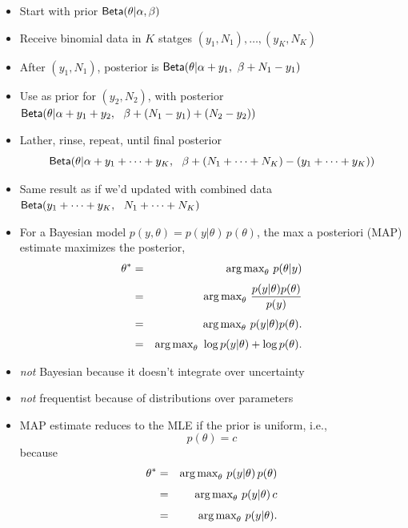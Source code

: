 \documentclass[10pt]{report}
\begin{document}
\vspace*{-4pt}
\begin{itemize}
\item Start with prior $\text{\sf Beta}(\theta|\alpha,\beta)$
\item Receive binomial data in $K$ statges $(y_1, N_1), \ldots, (y_K, N_K)$
\item After $(y_1,N_1)$, posterior is 
  $\text{\sf Beta}(\theta|\alpha + y_1, \ \beta + N_1 - y_1)$
\item Use as prior for $(y_2,N_2)$, with posterior \\[3pt]
  $\distro{Beta}(\theta|\alpha + y_1 + y_2, \ \ \beta + (N_1 -
  y_1) + (N_2 - y_2))$
\item Lather, rinse, repeat, until final posterior
\[
\text{\sf Beta}(\theta|\alpha + y_1 + \cdots + y_K, \ \ \beta + (N_1 +
\cdots + N_K) - (y_1 + \cdots + y_K))
\]
\item Same result as if we'd updated with combined data \\[3pt]
$\text{\sf Beta}(y_1 + \cdots + y_K, \ \ N_1 + \cdots + N_K)$
\end{itemize}



\vspace*{-4pt}
\begin{itemize}
\item For a Bayesian model $p(y,\theta) = p(y|\theta) \, p(\theta)$,
the max a posteriori (MAP) estimate maximizes the posterior,
\begin{eqnarray*}
\theta^{*} 
& = & \mbox{arg\,max}_{\theta} \ p(\theta|y)
\\[3pt]
& = & \mbox{arg\,max}_{\theta} \ \frac{\displaystyle p(y|\theta) p(\theta)}{p(y)}
\\[3pt]
& = & \mbox{arg\,max}_{\theta} \ p(y|\theta) p(\theta).
\\[3pt]
& = & \mbox{arg\,max}_{\theta} \ \log p(y|\theta) + \log p(\theta).
\end{eqnarray*}
\item \emph{not} Bayesian because it doesn't integrate over uncertainty
\item \emph{not} frequentist because of distributions over parameters

\end{itemize}

\begin{itemize}
\item MAP estimate reduces to the MLE if the prior is uniform, i.e.,
\[
p(\theta) = c
\]
because
\begin{eqnarray*}
\theta^{*} & = & \mbox{arg\,max}_{\theta} \ p(y|\theta) \, p(\theta)
\\[4pt]
& = & \mbox{arg\,max}_{\theta} \ p(y|\theta) \, c
\\[4pt]
& = & \mbox{arg\,max}_{\theta} \ p(y|\theta).
\end{eqnarray*}
\end{itemize}
\end{document}
